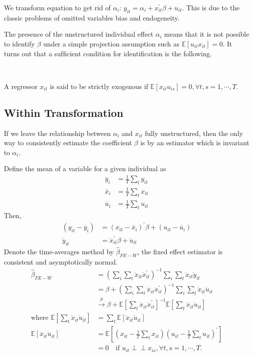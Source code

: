 We transform equation to get rid of $\alpha_i$: $y_{it} = \alpha_i + x_{it}^{\prime} \beta + u_{it}.$
This is due to the classic problems of omitted variables bias and endogeneity. 

The presence of the unstructured individual effect $\alpha_i$ means that it is not possible to identify $\beta$ under a simple projection assumption such as $\mathbb{E}[u_{it} x_{it}] = 0$.
It turns out that a sufﬁcient condition for identiﬁcation is the following.

\begin{definition}\label{def:strictly_exogenous}
    \

    A regressor $x_{it}$ is said to be strictly exogenous if $\mathbb{E}[x_{it} u_{is}] = 0, \forall t, s = 1, \cdots, T$.
\end{definition}

\subsection{Within Transformation}
If we leave the relationship between $\alpha_i$ and $x_{it}$ fully unstructured,
then the only way to consistently estimate the coefficient $\beta$ is by an estimator
which is invariant to $\alpha_i$.

Deﬁne the mean of a variable for a given individual as
\begin{align*}
    \overline{y}_i &= \frac{1}{T} \sum_t y_{it} \\
    \overline{x}_i &= \frac{1}{T} \sum_t x_{it} \\
    \overline{u}_i &= \frac{1}{T} \sum_t u_{it}
\end{align*}
Then, 
\begin{align*}
    (y_{it} - \overline{y}_i) &= (x_{it} - \overline{x}_i)^{\prime} \beta + (u_{it} -\overline{u}_i) \\
    \ddot{y}_{it} &= \ddot{x}_{it}^{\prime} \beta + \ddot{u}_{it}
\end{align*}
Denote the time-averages method by $\hat{\beta}_{FE-W}$, the fixed effect estimator is consistent and asymptotically normal.
\begin{align*}
    \hat{\beta}_{FE-W} &= \left(\sum_i \sum_t \ddot{x}_{it} \ddot{x}_{it}^{\prime} \right)^{-1} \sum_i \sum_t \ddot{x}_{it} \ddot{y}_{it} \\
    &= \beta + \left(\sum_i \sum_t \ddot{x}_{it} \ddot{x}_{it}^{\prime} \right)^{-1} \sum_i \sum_t \ddot{x}_{it} \ddot{u}_{it} \\
    &\overset{p}{\rightarrow} \beta + \mathbb{E}\left[\sum_t \ddot{x}_{it} \ddot{x}_{it}^{\prime} \right]^{-1} \mathbb{E}\left[\sum_t \ddot{x}_{it} \ddot{u}_{it} \right] \\
    \text{where } \mathbb{E}\left[\sum_t \ddot{x}_{it} \ddot{u}_{it}\right] &= \sum_t \mathbb{E}\left[\ddot{x}_{it} \ddot{u}_{it} \right]\\
    \mathbb{E}\left[\ddot{x}_{it} \ddot{u}_{it} \right] &= \mathbb{E}\left[\left(x_{it} - \frac{1}{T}\sum_t x_{it} \right) \left(u_{it} - \frac{1}{T}\sum_t u_{it} \right)^{\prime} \right] \\
    &= 0 \quad \text{if } u_{it} \perp\!\!\!\perp x_{is}, \forall t, s = 1, \cdots, T.
\end{align*}

